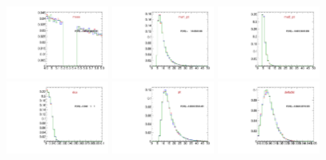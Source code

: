 \begin{figure}
  \includegraphics[width=0.3\textwidth]{Figures/VariablesComparison/Data_barrel_figs_3h/mass}
  \includegraphics[width=0.3\textwidth]{Figures/VariablesComparison/Data_barrel_figs_3h/mu1_pt}
  \includegraphics[width=0.3\textwidth]{Figures/VariablesComparison/Data_barrel_figs_3h/mu2_pt}
  \includegraphics[width=0.3\textwidth]{Figures/VariablesComparison/Data_barrel_figs_3h/dca}
  \includegraphics[width=0.3\textwidth]{Figures/VariablesComparison/Data_barrel_figs_3h/pt}
  \includegraphics[width=0.3\textwidth]{Figures/VariablesComparison/Data_barrel_figs_3h/delta3d}

\end{figure}
